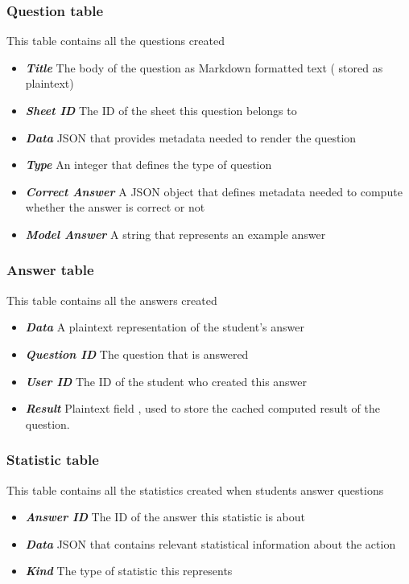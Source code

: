 \subsubsection{Question table}
This table contains all the questions created

\begin{itemize}
	\item  \textit{\textbf{Title}} The body of the question as Markdown formatted text ( stored as plaintext)
	\item  \textit{\textbf{Sheet ID}} The ID of the sheet this question belongs to
	\item  \textit{\textbf{Data}} JSON that provides metadata needed to render the question
	\item  \textit{\textbf{Type}} An integer that defines the type of question
	\item  \textit{\textbf{Correct Answer}} A JSON object that defines metadata needed to compute whether the answer is correct or not	
	\item  \textit{\textbf{Model Answer}} A string that represents an example answer
\end{itemize}

\subsubsection{Answer table}
This table contains all the answers created

\begin{itemize}
	\item  \textit{\textbf{Data}} A plaintext representation of the student's answer
	\item  \textit{\textbf{Question ID}} The question that is answered
	\item  \textit{\textbf{User ID}} The ID of the student who created this answer
	\item  \textit{\textbf{Result}} Plaintext field , used to store the cached computed result of the question.
\end{itemize}

\subsubsection{Statistic table}
This table contains all the statistics created when students answer questions

\begin{itemize}
	\item  \textit{\textbf{Answer ID}} The ID of the answer this statistic is about
	\item  \textit{\textbf{Data}} JSON that contains relevant statistical information about the action
	\item  \textit{\textbf{Kind}} The type of statistic this represents
\end{itemize}



